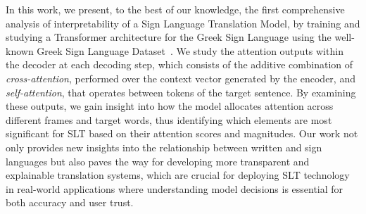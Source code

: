 In this work, we present, to the best of our knowledge, the first comprehensive analysis of interpretability of a Sign Language Translation Model, by training and studying a Transformer architecture for the Greek Sign Language using the well-known Greek Sign Language Dataset~\cite{adaloglou2020comprehensive}. We  study the attention outputs within the decoder at each decoding step, which consists of the additive combination of \textit{cross-attention}, performed over the context vector generated by the encoder, and \textit{self-attention}, that operates between tokens of the target sentence. By examining these outputs, we gain insight into how the model allocates attention across different frames and target words, thus identifying which elements are most significant for SLT based on their attention scores and magnitudes. Our work not only provides new insights into the relationship between written and sign languages but also paves the way for developing more transparent and explainable translation systems, which are crucial for deploying SLT technology in real-world applications where understanding model decisions is essential for both accuracy and user trust.